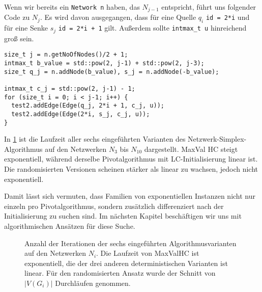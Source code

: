 Wenn wir bereits ein \lstinline|Network n| haben, das $N_{j-1}$ entspricht, führt uns folgender Code zu $N_{j}$. Es wird davon ausgegangen, dass für eine Quelle $q_i$ \lstinline|id = 2*i| und für eine Senke $s_j$ \lstinline|id = 2*i + 1| gilt. Außerdem sollte \lstinline|intmax_t u| hinreichend groß sein.

\begin{lstlisting}
size_t j = n.getNoOfNodes()/2 + 1;
intmax_t b_value = std::pow(2, j-1) + std::pow(2, j-3);
size_t q_j = n.addNode(b_value), s_j = n.addNode(-b_value);

intmax_t c_j = std::pow(2, j-1) - 1;
for (size_t i = 0; i < j-1; i++) {
  test2.addEdge(Edge(q_j, 2*i + 1, c_j, u));
  test2.addEdge(Edge(2*i, s_j, c_j, u));
}
\end{lstlisting}

In \cref{fig:plot_exp} ist die Laufzeit aller sechs eingeführten Varianten des Netzwerk-Simplex-Algorithmus auf den Netzwerken $N_3$ bis $N_{10}$ dargestellt. MaxVal HC steigt exponentiell, während derselbe Pivotalgorithmus mit LC-Initialisierung linear ist. Die randomisierten Versionen scheinen stärker als linear zu wachsen, jedoch nicht exponentiell.

Damit lässt sich vermuten, dass Familien von exponentiellen Instanzen nicht nur einzeln pro Pivotalgorithmus, sondern zusätzlich differenziert nach der Initialisierung zu suchen sind. Im nächsten Kapitel beschäftigen wir uns mit algorithmischen Ansätzen für diese Suche. 

\begin{figure}[!ht]\centering
    
    \caption{Anzahl der Iterationen der sechs eingeführten Algorithmusvarianten auf den Netzwerken $N_i$. Die Laufzeit von MaxValHC ist exponentiell, die der drei anderen deterministischen Varianten ist linear. Für den randomisierten Ansatz wurde der Schnitt von $|V(G_i)|$ Durchläufen genommen.}
    \label{fig:plot_exp}
\end{figure}
